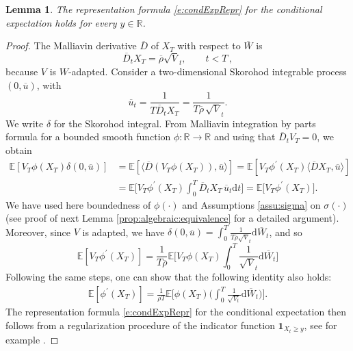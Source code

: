 \documentclass[11pt]{article}
\theoremstyle{plain}
\newtheorem{lemma}[theorem]{Lemma}
\theoremstyle{definition}
\theoremstyle{remark}
\newcommand{\R}{\mathbb{R}}
\renewcommand{\bar}{\overline}
\renewcommand{\hat}{\widehat}
\newcommand{\dd}{\mathrm{d}}
\newcommand{\bE}{\mathbb{E}}
\newcommand{\1}{\mathbf{1}}
\numberwithin{equation}{section}
\def\mino{<}
\begin{document}
\begin{lemma}\label{lemma:cond:exp}
The  representation formula \eqref{e:condExpRepr} for the conditional expectation holds for every $y \in \R$. 
\end{lemma}
\begin{proof}
The Malliavin derivative $\bar{D}$ of $X_T$ with respect to $\bar{W}$ is
\[
\bar{D}_t X_T = \bar{\rho} \sqrt{V}_t,
\qquad t \mino T \,,
\]
because $V$ is $W$-adapted. Consider a two-dimensional Skorohod integrable process $(0,\bar{u})$, with
\[
\bar{u}_t=\frac{1}{T \bar{D}_t X_T}
=
\frac{1}{T  \bar{\rho} \, \sqrt{V}_t}.
\]
We write $\delta$ for the Skorohod integral.
From Malliavin integration by parts formula for a bounded smooth function $\phi: \R \to \R$ and using that $\bar{D}_t V_T=0$,
we obtain
\[
\begin{aligned}
\bE
[V_T \phi(X_T) \delta(0,\bar{u})]
&=
\bE
[\langle \bar{D}(V_T \phi(X_T)),\bar{u}\rangle]
=
\bE
[V_T \phi^{\prime}(X_T) \langle \bar{D}X_T,\bar{u}\rangle]
\\
&= 
\bE
\Big[
V_T \phi^{\prime}(X_T) \int_0^T \bar{D}_t X_T \, \bar{u}_t \dd t
\Big]
=
\bE
\big[
V_T \phi^{\prime}(X_T)
\big].
\end{aligned}
\]
We have used here boundedness of $\phi(\cdot)$ and Assumptions \ref{assu:sigma} on $\sigma(\cdot)$  (see proof of next Lemma \ref{prop:algebraic:equivalence} for a detailed argument).
Moreover, since $V$ is adapted, %
we have $\delta(0,\bar{u})=\int_0^T \frac{1}{T  \bar{\rho} \sqrt{V}_t} \dd \bar{W}_t$, and so
\[
\bE
[V_T \phi^{\prime}(X_T)]
=
\frac{1}{T  \bar{\rho} }
\bE
\Big[V_T \phi(X_T) \int_0^T \frac{1}{\sqrt{V}_t} \dd \bar{W}_t
\Big]
\]
Following the same steps, one can show that the following identity also holds:
\[
\begin{split}
\bE
[
\phi^{\prime}(X_T)
]=
\frac{1}{\bar{\rho} T}
\bE
\Big[
\phi(X_T) \big( \int_0^T\frac{1}{ \sqrt{V_t}} \dd \bar{W}_t\big)
\Big].
\end{split}
\]
The representation formula \eqref{e:condExpRepr} for the conditional expectation then follows from a regularization procedure of the indicator function $\1_{X_t \ge y}$, see for example \cite{bally:inria-00071868}.
\end{proof}
\end{document}
